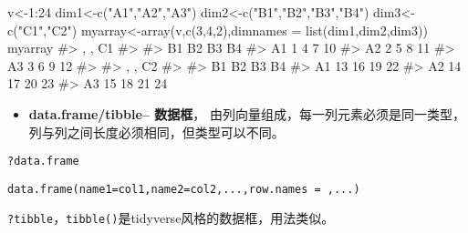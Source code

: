 \documentclass[
  letterpaper,
  DIV=11,
  numbers=noendperiod]{scrreprt}
\newenvironment{Shaded}{\begin{snugshade}}{\end{snugshade}}
\newcommand{\AttributeTok}[1]{\textcolor[rgb]{0.40,0.45,0.13}{#1}}
\newcommand{\CommentTok}[1]{\textcolor[rgb]{0.37,0.37,0.37}{#1}}
\newcommand{\DecValTok}[1]{\textcolor[rgb]{0.68,0.00,0.00}{#1}}
\newcommand{\FunctionTok}[1]{\textcolor[rgb]{0.28,0.35,0.67}{#1}}
\newcommand{\NormalTok}[1]{\textcolor[rgb]{0.00,0.23,0.31}{#1}}
\newcommand{\OtherTok}[1]{\textcolor[rgb]{0.00,0.23,0.31}{#1}}
\newcommand{\SpecialCharTok}[1]{\textcolor[rgb]{0.37,0.37,0.37}{#1}}
\newcommand{\StringTok}[1]{\textcolor[rgb]{0.13,0.47,0.30}{#1}}
\providecommand{\tightlist}{%
  \setlength{\itemsep}{0pt}\setlength{\parskip}{0pt}}\usepackage{longtable,booktabs,array}
\begin{document}
\begin{Shaded}
\begin{Highlighting}[]
\NormalTok{v}\OtherTok{\textless{}{-}}\DecValTok{1}\SpecialCharTok{:}\DecValTok{24} 
\NormalTok{dim1}\OtherTok{\textless{}{-}}\FunctionTok{c}\NormalTok{(}\StringTok{"A1"}\NormalTok{,}\StringTok{"A2"}\NormalTok{,}\StringTok{"A3"}\NormalTok{) }
\NormalTok{dim2}\OtherTok{\textless{}{-}}\FunctionTok{c}\NormalTok{(}\StringTok{"B1"}\NormalTok{,}\StringTok{"B2"}\NormalTok{,}\StringTok{"B3"}\NormalTok{,}\StringTok{"B4"}\NormalTok{)}
\NormalTok{dim3}\OtherTok{\textless{}{-}}\FunctionTok{c}\NormalTok{(}\StringTok{"C1"}\NormalTok{,}\StringTok{"C2"}\NormalTok{) }
\NormalTok{myarray}\OtherTok{\textless{}{-}}\FunctionTok{array}\NormalTok{(v,}\FunctionTok{c}\NormalTok{(}\DecValTok{3}\NormalTok{,}\DecValTok{4}\NormalTok{,}\DecValTok{2}\NormalTok{),}\AttributeTok{dimnames =} \FunctionTok{list}\NormalTok{(dim1,dim2,dim3)) }
\NormalTok{myarray}
\CommentTok{\#\textgreater{} , , C1}
\CommentTok{\#\textgreater{} }
\CommentTok{\#\textgreater{}    B1 B2 B3 B4}
\CommentTok{\#\textgreater{} A1  1  4  7 10}
\CommentTok{\#\textgreater{} A2  2  5  8 11}
\CommentTok{\#\textgreater{} A3  3  6  9 12}
\CommentTok{\#\textgreater{} }
\CommentTok{\#\textgreater{} , , C2}
\CommentTok{\#\textgreater{} }
\CommentTok{\#\textgreater{}    B1 B2 B3 B4}
\CommentTok{\#\textgreater{} A1 13 16 19 22}
\CommentTok{\#\textgreater{} A2 14 17 20 23}
\CommentTok{\#\textgreater{} A3 15 18 21 24}
\end{Highlighting}
\end{Shaded}

\begin{itemize}
\tightlist
\item
  \textbf{data.frame/tibble-- 数据框}，
  由列向量组成，每一列元素必须是同一类型，列与列之间长度必须相同，但类型可以不同。
\end{itemize}

\texttt{?data.frame}

\texttt{data.frame(name1=col1,name2=col2,...,row.names\ =\ ,...)}

\texttt{?tibble}，\texttt{tibble()}是tidyverse风格的数据框，用法类似。
\end{document}
